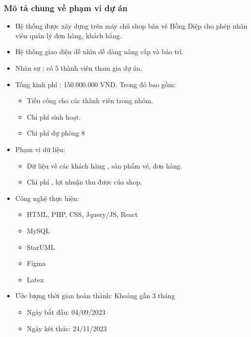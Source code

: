 \documentclass[12pt]{article}
\begin{document}
\subsubsection{Mô tả chung về phạm vi dự án}
\begin{itemize}[label=-, leftmargin=1cm]
\item Hệ thống được xây dựng trên máy chủ shop bán vé Hồng Diệp cho phép nhân viên quản lý đơn hàng, khách hàng.
\item Hệ thống giao diện dễ nhìn dễ dàng nâng cấp và bảo trì.
\item Nhân sự : có 5 thành viên tham gia dự án.
\item Tổng kinh phí : 150.000.000 VND. Trong đó bao gồm:
    \begin{itemize}[label=+, leftmargin=1cm]
    \item Tiền công cho các thành viên trong nhóm.
    \item Chi phí sinh hoạt.
    \item Chi phí dự phòng 8%
    \end{itemize}
\item Phạm vi dữ liệu:
    \begin{itemize}[label=+, leftmargin=1cm]
    \item Dữ liệu về các khách hàng , sản phẩm vé, đơn hàng.
    \item Chi phí , lợi nhuận thu được của shop.
    \end{itemize}
\item Công nghệ thực hiện:
    \begin{itemize}[label=+, leftmargin=1cm]
    \item HTML, PHP, CSS, Jquery/JS, React
    \item MySQL
    \item StarUML
    \item Figma
    \item Latex
    \end{itemize}
\item Ước lượng thời gian hoàn thành: Khoảng gần 3 tháng
    \begin{itemize}[label=+, leftmargin=1cm]
    \item Ngày bắt đầu: 04/09/2023
    \item Ngày kết thúc: 24/11/2023
    \end{itemize}
\end{itemize}
\end{document}
